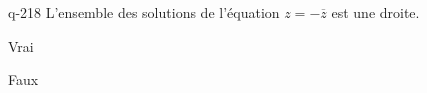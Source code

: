 \begin{truefalse}{q-218}
L'ensemble des solutions de l'équation $z=-\overline z$ est une droite.
\item* Vrai
\item Faux
\end{truefalse}

